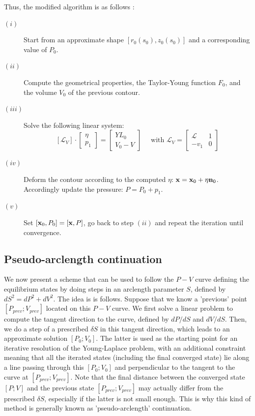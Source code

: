 \documentclass{jfm}
\newcommand\be{\begin{equation}}
\newcommand\ee{\end{equation}}
\begin{document}
Thus, the modified algorithm is as follows :
\begin{description}

\item[$(i)$ ] Start from an approximate shape $[r_0(s_0), z_0(s_0)]$ and a corresponding value of $P_0$.

\item[$(ii)$ ] Compute the geometrical properties, the Taylor-Young function $F_0$, and the volume $V_0$ 
of the previous contour.

\item[$(iii)$ ] Solve the following linear system: 
\be 
\left[
{\mathcal L}_V
\right] \cdot 
\left[
\begin{array}{c} \eta \\ p_1 \end{array} 
\right]
= 
\left[
\begin{array}{c} YL_0 \\ V_0-V \end{array} 
\right]
\quad \mbox{ with }
{\mathcal L}_V = 
\left[
\begin{array}{cc} {\mathcal L} &  1\\ - v_1 & 0 \end{array} 
\right] 
\ee
\item[$(iv)$ ] Deform the contour according to the computed $\eta$:  ${\bf x} = {\bf x}_0 + \eta {\bf n}_0$. Accordingly update the pressure: $P = P_0 + p_1$.


\item[$(v)$ ] Set $[{\bf x}_0,P_0] = [{\bf x},P]$, go back to step $(ii)$ and repeat the iteration until convergence. 

\end{description}

\subsection{Pseudo-arclength continuation}

We now present a scheme that can be used to follow the $P-V$ curve defining the equilibrium states by doing steps in an arclength parameter $S$, defined by $dS^2 = dP^2+dV^2$.
The idea is is follows. Suppose that we know a 'previous' point $[P_{prev} ; V_{prev}]$
located on this $P-V$ curve. We first solve a linear problem to compute the tangent direction to the curve, 
defined by $dP/dS$ and $dV/dS$. Then, we do a step of a prescribed $\delta S$ in this tangent direction, which leads to an approximate solution $[P_{0} ; V_{0}]$. The latter is used as the starting point for an iterative resolution of the Young-Laplace problem, with an additional constraint meaning that all the iterated states (including the final converged state) lie along a line passing through this $[P_{0} ; V_{0}]$ and perpendicular to the tangent 
to the curve at $[P_{prev} ; V_{prev} ]$. Note that the final distance between the converged state $[P; V]$ and the previous state $[P_{prev} ; V_{prev} ]$ may actually differ from the prescribed $\delta S$, especially if the latter is not small enough. This is why this kind of method is generally known as 'pseudo-arclength' continuation.
\end{document}
